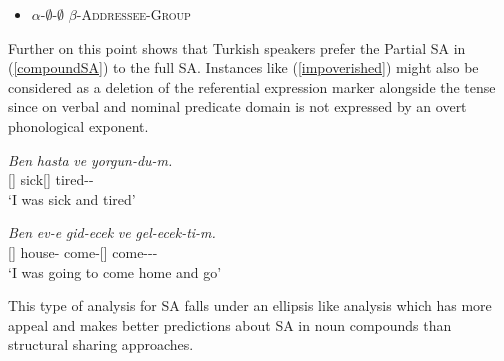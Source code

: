 \begin{itemize}
    \item $\alpha$-$\emptyset$-$\emptyset$ {\And} $\beta$-{\textsc{Addressee}-\textsc{Group}}
\end{itemize}

Further on this point \cite{kharytonava2011morphology} shows that Turkish speakers prefer the Partial SA in (\ref{compoundSA}) to the full SA. Instances like (\ref{impoverished}) might also be considered as a deletion of the referential expression marker alongside the tense since {\Tsg} on verbal and nominal predicate domain is not expressed by an overt phonological exponent.

\begin{exe}
    \ex \label{impoverished}
    \begin{xlist}
        \ex \gll 
        \textit{Ben} \textit{hasta} \textit{ve} \textit{yorgun-du-m.} \\ {\First}{\Sg}[{\Nom}] sick[{\Third}{\Sg}] {\And} tired-{\Pst}-{\First}{\Sg} \\
        \glt `I was sick and tired'
        
        \ex \gll
        \textit{Ben} \textit{ev-e} \textit{gid-ecek} \textit{ve} \textit{gel-ecek-ti-m.} \\ {\First}{\Sg}[{\Nom}] house-{\Dat} come-{\Fut}[{\Third}{\Sg}] {\And} come-{\Fut}-{\Pst}-{\First}{\Sg} \\
        \glt `I was going to come home and go'
    \end{xlist}
\end{exe}

This type of analysis for SA falls under an ellipsis like analysis which has more appeal and makes better predictions about SA in noun compounds than structural sharing approaches.